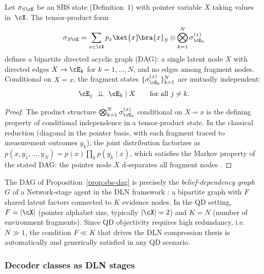 \begin{proposition}
\label{prop:sbs-dag}
Let $\sigma_{S\cE}$ be an SBS state (Definition~1) with pointer variable
$X$ taking values in~$\cX$.  The tensor-product form
\begin{equation}
  \sigma_{S\cE}
  = \sum_{x\in\cX} p_x \ket{x}\!\bra{x}_S
    \otimes \bigotimes_{k=1}^{N} \sigma^{(x)}_{\cE_k}
  \label{eq:sbs-factor}
\end{equation}
defines a bipartite directed acyclic graph (DAG): a single latent node
$X$ with directed edges $X \to \cE_k$ for $k=1,\dots,N$, and no edges
among fragment nodes.
Conditional on $X=x$, the fragment states
$\{\sigma^{(x)}_{\cE_k}\}_{k=1}^{N}$ are mutually independent:
\[
  \cE_j \;\perp\!\!\!\perp\; \cE_k \mid X
  \qquad \text{for all } j\neq k.
\]
\end{proposition}

\begin{proof}
The product structure
$\bigotimes_{k=1}^{N}\sigma^{(x)}_{\cE_k}$ conditional on $X=x$ is the
defining property of conditional independence in a tensor-product state.
In the classical reduction (diagonal in the pointer basis, with each
fragment traced to measurement outcomes $y_k$), the joint distribution
factorizes as
$p(x,y_1,\dots,y_N)=p(x)\prod_k p(y_k\mid x)$,
which satisfies the Markov property of the stated DAG:
the pointer node $X$ d-separates all fragment nodes
\citep{Pearl1988}.
\end{proof}

\begin{remark}
\label{rem:sbs-factor}
The DAG of Proposition~\ref{prop:sbs-dag} is precisely the
\emph{belief-dependency graph}~$G$ of a Network-stage agent in the DLN
framework \citep[Sec.~2.1]{WuDLNCompression2026preprint}: a bipartite
graph with $F$ shared latent factors connected to $K$ evidence nodes.
In the QD setting, $F=|\cX|$ (pointer alphabet size, typically
$|\cX|=2$) and $K=N$ (number of environment fragments).
Since QD objectivity requires high redundancy, i.e.\ $N\gg 1$, the
condition $F \ll K$ that drives the DLN compression thesis is
automatically and generically satisfied in any QD scenario.
\end{remark}


\subsubsection{Decoder classes as DLN stages}


